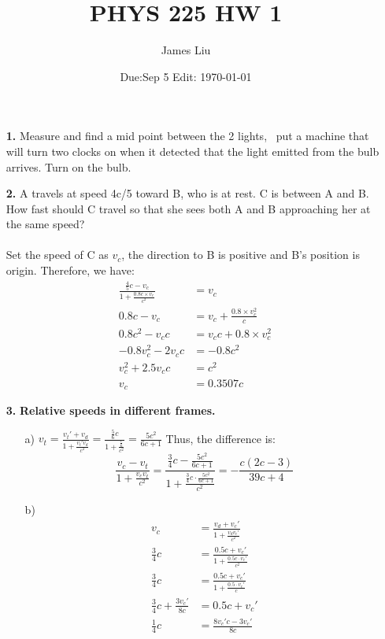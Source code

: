 \documentclass{article}
\date{Due:Sep 5 Edit: \today}
\title{PHYS 225 HW 1}
\author{James Liu}
\begin{document}
\maketitle
\begin{itemize}
    \item [\textbf{1.}] Measure and find  a mid point between the 2 lights, \
    put a machine that will turn two clocks on when it detected that the light emitted from the bulb arrives. Turn on the bulb.
    \item [\textbf{2.}] A travels at speed 4c/5 toward B, who is at rest. C is between A and B. How fast should
    C travel so that she sees both A and B approaching her at the same speed? 
    \\ \\ 
    Set the speed of C as \(v_c\), the direction to B is positive and B's position is origin. Therefore, we have:
    \begin{align*}
        \frac{\frac{4}{5}c-v_c}{1+\frac{0.8c\times v_c}{c^2}}&=v_c\\
        0.8c-v_c &=v_c+\frac{0.8\times v_c^2}{c}\\
        0.8c^2-v_cc &=v_cc+0.8\times v_c^2\\
        -0.8v_c^2-2v_cc&=-0.8c^2\\
        v_c^2+2.5v_cc&=c^2\\
        v_c&=0.3507 c
    \end{align*}
    \newpage
    \item [\textbf{3.}] \textbf{Relative speeds in different frames.}
    \begin{itemize}
        \item [a)]
        \(\displaystyle v_t = \frac{v_t'+v_d}{1+\frac{v_t'v_d}{c^2}}=\frac{\frac{5}{6}c}{1+\frac{\frac{c}{6}}{c^2}}=\frac{5c^2}{6c+1}\)
        Thus, the difference is:
        \[\frac{v_c-v_t}{1+\frac{v_cv_t}{c^2}}=\frac{\frac{3}{4}c-\frac{5c^2}{6c+1}}{1+\frac{\frac{3}{4}c\cdot\frac{5c^2}{6c+1}}{c^2}}=-\frac{c(2c-3)}{39c+4}\]
        \item [b)]
        \begin{align*}
            v_c &= \frac{v_d+v_c'}{1+\frac{v_dv_c'}{c^2}}\\
            \frac{3}{4}c &= \frac{0.5c+v_c'}{1+\frac{0.5c\cdot v_c'}{c^2}}\\
            \frac{3}{4}c &= \frac{0.5c+v_c'}{1+\frac{0.5\cdot v_c'}{c}}\\
            \frac{3}{4}c + \frac{3v_c'}{8c}&= 0.5c+v_c'\\
            \frac{1}{4}c &= \frac{8v_c'c-3v_c'}{8c}\\

\end{align*}
\end{itemize}
\end{itemize}
\end{document}
